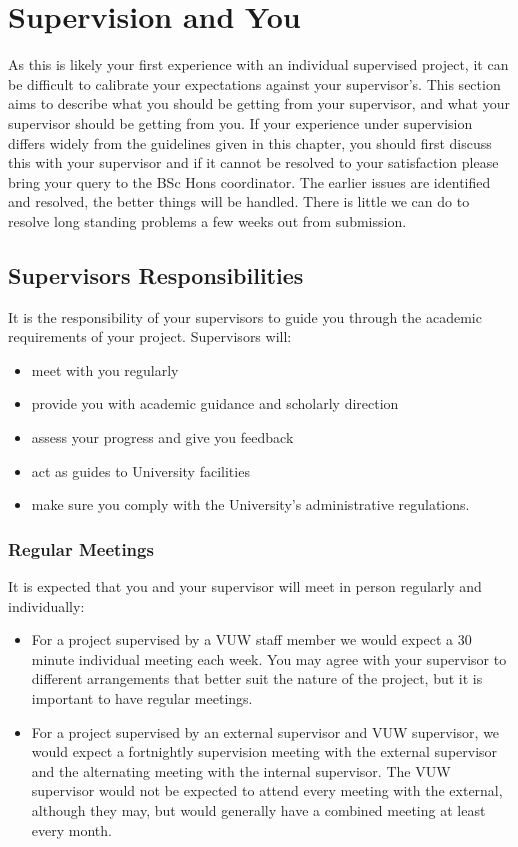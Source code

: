 \chapter{Supervision and You}


As this is likely your first experience with an individual supervised project, it
can be difficult to calibrate your expectations against your
supervisor's.  This section aims to describe what you
should be getting from your supervisor, and what your supervisor
should be getting from you.  If your experience under supervision differs widely from
the guidelines given in this chapter, you should first discuss this with
your supervisor and if it cannot be resolved to your satisfaction
please bring your query to the BSc Hons coordinator.  The earlier issues are
identified and resolved, the better things will be handled.  There is
little we can do to resolve long standing problems a few weeks out
from submission.

\section{Supervisors Responsibilities}

It is the responsibility of your supervisors to guide you through the
academic requirements of your project. Supervisors will:
\begin{itemize}
\item meet with you regularly
\item provide you with academic guidance and scholarly direction
\item assess your progress and give you feedback
\item act as guides to University facilities
\item make sure you comply with the University’s administrative regulations.
\end{itemize}

\subsection{Regular Meetings}
It is expected that you and your supervisor will meet in person
regularly and individually:
\begin{itemize}
\item For a project supervised by a VUW staff member we would expect 
a 30 minute individual meeting each week.  You may agree
with your supervisor to different arrangements that better suit the
nature of the project, but it is important to have regular meetings.

\item For a project supervised by an external supervisor and VUW
supervisor, we would expect a fortnightly supervision meeting with the
external supervisor and the alternating meeting with the internal supervisor.
The VUW supervisor would not be expected to
attend every meeting with the external, although they may, but would generally have a combined meeting at
least every month.
\end{itemize}

